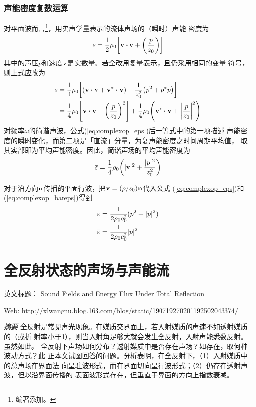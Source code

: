 \documentclass[UTF8]{ctexbook}
\let\stdsection\section
\renewcommand\section{\newpage\stdsection}
\begin{document}
\subsubsection{声能密度复数运算}
对平面波而言\footnote{编著添加。}，用实声学量表示的流体声场的（瞬时）声能
密度为
$$\eps = \frac12 \rho_0 \qty[\vb{v} \vdot \vb{v} +\qty(\frac{p}{z_0})]$$
其中的声压$p$和速度$\vb{v}$是实数量。若全改用复量表示，且仍采用相同的变量
符号，则上式应改为
\begin{align}
	\label{eq:complexop_eps}
	\eps & = \frac14 \rho_0 \qty[(\vb{v}\vdot\vb{v} + \vb{v}^*\vdot
	\vb{v}) +\frac{1}{z_0^2} \qty(p^2+p^* p)]\nonumber\\
	& = \frac14 \rho_0 \qty[\vb{v}\vdot\vb{v}+ \qty(\frac{p}{z_0} )^2]
	+\frac14 \rho_0 \qty(\vb{v}^*\vdot \vb{v} + \qty|\frac{p}{z_0}|^2)
\end{align}
对频率$\omega$的简谐声波，公式(\ref{eq:complexop_eps})后一等式中的第一项描述
声能密度的瞬时变化，而第二项是「直流」分量，为复声能密度之时间周期平均值，
取其实部即为平均声能密度。因此，简谐声场的平均声能密度为
\begin{equation}
	\label{eq:complexop_bareps}
	\overline{\varepsilon} = \frac14 \rho_0 \qty(|\vb{v}|^2 +\frac{|p|^2}{z_0^2})
\end{equation}

对于沿方向$\vb{n}$传播的平面行波，把$\vb{v}=(p/z_0)\vb{n}$代入公式
(\ref{eq:complexop_eps})和(\ref{eq:complexop_bareps})得到
\begin{align*}
	\varepsilon &= \frac{1}{2\rho_0c_0^2} (p^2+|p|^2)\\
	\overline{\varepsilon} &= \frac{1}{2\rho_0c_0^2} |p|^2
\end{align*}


\section{全反射状态的声场与声能流}
英文标题：
Sound Fields and Energy Flux Under Total Reflection

Web:
http://xlwangnu.blog.163.com/blog/static/190719270201192502043374/

\emph{摘要}
全反射是常见声光现象。在媒质交界面上，若入射媒质的声速不如透射媒质的（或折
射率小于1），则当入射角足够大就会发生全反射，入射声能悉数反射。虽然如此，
全反射下声场如何分布？透射媒质中是否存在声场？如存在，取何种波动方式？此
正本文试图回答的问题。分析表明，在全反射下，（1）入射媒质中的总声场在界面法
向呈驻波形式，而在界面切向呈行波形式；（2）仍存在透射声波，但以沿界面传播的
表面波形式存在，但垂直于界面的方向上指数衰减。
\end{document}
